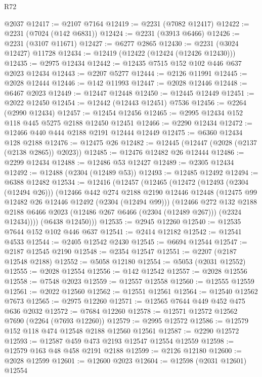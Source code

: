 \begin{lexlean}{R72}
\begin{coremodule}
    @2037
@12417 := @2107 @7164
@12419 := @2231 (@7082 @12417)
@12422 := @2231 (@7024 (@142 @6831))
@12424 := @2231 (@3913 @6466)
@12426 := @2231 (@3107 @11671)
@12427 := @6277 @2865
@12430 := @2231 (@3024 @12427) @11728
@12434 := @12419 (@12422 (@12424 (@12426 @12430)))
@12435 := @2975 @12434
@12442 := @12435 @7515 @152 @102 @446 @637 @2023 @12434
@12443 := @2207 @5277
@12444 := @2126 @11991
@12445 := @2028 @12444
@12446 := @142 @11993
@12447 := @2028 @12446
@12448 := @6467 @2023
@12449 := @12447 @12448
@12450 := @12445 @12449
@12451 := @2022 @12450
@12454 := @12442 (@12443 @12451) @7536
@12456 := @2264 (@2990 @12434)
@12457 := @12454 @12456
@12465 := @2995 @12434 @152 @118 @445 @5275 @2188 @12450 @12451
@12466 := @2290 @12434
@12472 := @12466 @440 @444 @2188 @2191 @12444 @12449
@12475 := @6360 @12434 @128 @2188
@12476 := @12475 @26
@12482 := @12445 (@12447 (@2028 (@2137 (@2138 @2865)) @2023))
@12485 := @12476 @12482 @26 @12444
@12486 := @2299 @12434
@12488 := @12486 @53 @12427
@12489 := @2305 @12434
@12492 := @12488 (@2304 (@12489 @53))
@12493 := @12485 @12492
@12494 := @6388 @12482
@12534 := @12416
    (@12457
      (@12465
        (@12472
          (@12493 (@2304 (@12494 @26)))
          (@12466
            @442
            @274
            @2188
            @2190
            @12446
            @12448
            (@12475 @99 @12482 @26 @12446 @12492 (@2304 (@12494 @99)))
            (@12466
              @272
              @132
              @2188
              @2188
              @6466
              @2023
              (@12486 @267 @6466 (@2304 (@12489 @267)))
              (@2324 @12434))))
        (@6438 @12450)))
@12535 := @2945 @12260
@12540 := @12535 @7644 @152 @102 @446 @637
@12541 := @2414 @12182
@12542 := @12541 @4533
@12544 := @2405 @12542 @2430
@12545 := @6694 @12544
@12547 := @2187 @12545 @2190
@12548 := @2354 @12547
@12551 := @2207 (@2187 @12548 @2188)
@12552 := @5058 @12180
@12554 := @5053 (@2031 @12552)
@12555 := @2028 @12554
@12556 := @142 @12542
@12557 := @2028 @12556
@12558 := @7548 @2023
@12559 := @12557 @12558
@12560 := @12555 @12559
@12561 := @2022 @12560
@12562 := @12551 @12561
@12564 := @12540 @12562 @7673
@12565 := @2975 @12260
@12571 := @12565 @7644 @449 @452 @475 @636 @2032
@12572 := @7684 @12260
@12578 := @12571 @12572 @12562 @7690 (@2264 (@7693 @12260))
@12579 := @2995 @12572
@12586 := @12579 @152 @118 @474 @12548 @2188 @12560 @12561
@12587 := @2290 @12572
@12593 := @12587 @459 @473 @2193 @12547 @12554 @12559
@12598 := @12579 @163 @48 @458 @2191 @2188
@12599 := @2126 @12180
@12600 := @2028 @12599
@12601 := @12600 @2023
@12604 := @12598 (@2031 @12601) @12554

\end{coremodule}
\end{lexlean}
